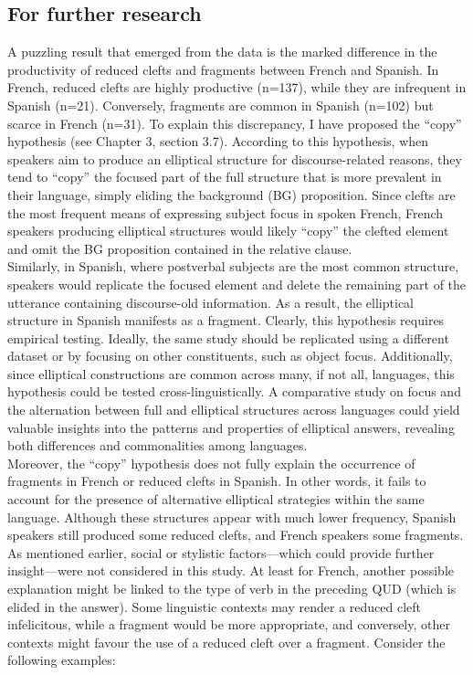 \subsection{For further research}
A puzzling result that emerged from the data is the marked difference in the productivity of reduced clefts and fragments between French and Spanish. In French, reduced clefts are highly productive (n=137), while they are infrequent in Spanish (n=21). Conversely, fragments are common in Spanish (n=102) but scarce in French (n=31). To explain this discrepancy, I have proposed the ``copy” hypothesis (see Chapter 3, section 3.7). According to this hypothesis, when speakers aim to produce an elliptical structure for discourse-related reasons, they tend to ``copy” the focused part of the full structure that is more prevalent in their language, simply eliding the background (BG) proposition. Since clefts are the most frequent means of expressing subject focus in spoken French, French speakers producing elliptical structures would likely ``copy” the clefted element and omit the BG proposition contained in the relative clause. \\
Similarly, in Spanish, where postverbal subjects are the most common structure, speakers would replicate the focused element and delete the remaining part of the utterance containing discourse-old information. As a result, the elliptical structure in Spanish manifests as a fragment.
Clearly, this hypothesis requires empirical testing. Ideally, the same study should be replicated using a different dataset or by focusing on other constituents, such as object focus. Additionally, since elliptical constructions are common across many, if not all, languages, this hypothesis could be tested cross-linguistically. A comparative study on focus and the alternation between full and elliptical structures across languages could yield valuable insights into the patterns and properties of elliptical answers, revealing both differences and commonalities among languages.\\
Moreover, the ``copy” hypothesis does not fully explain the occurrence of fragments in French or reduced clefts in Spanish. In other words, it fails to account for the presence of alternative elliptical strategies within the same language. Although these structures appear with much lower frequency, Spanish speakers still produced some reduced clefts, and French speakers some fragments. As mentioned earlier, social or stylistic factors—which could provide further insight—were not considered in this study. At least for French, another possible explanation might be linked to the type of verb in the preceding QUD (which is elided in the answer). Some linguistic contexts may render a reduced cleft infelicitous, while a fragment would be more appropriate, and conversely, other contexts might favour the use of a reduced cleft over a fragment. Consider the following examples: 

